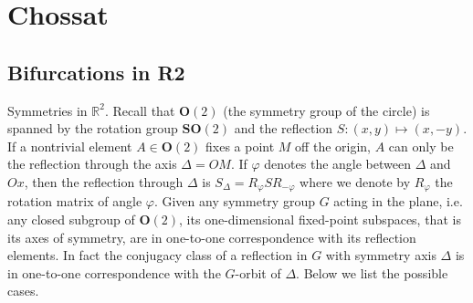 \documentclass{scrartcl}
\begin{document}
  \section{Chossat}
    \subsection{Bifurcations in R2}
    Symmetries in \(\mathbb{R}^{2}\).
    Recall that \(\mathbf{O}(2)\) (the symmetry group of the circle) is spanned by the rotation group \(\mathbf{S O}(2)\) and the reflection \(S:(x, y) \mapsto(x,-y)\).
    If a nontrivial element \(A \in \mathbf{O}(2)\) fixes a point \(M\) off the origin, \(A\) can only be the reflection through the axis \(\Delta = O M\).
    If \(\varphi\) denotes the angle between \(\Delta\) and \(O x\), then the reflection through \(\Delta\) is \(S_{\Delta}=R_{\varphi} S R_{-\varphi}\) where we denote by \(R_{\varphi}\) the rotation matrix of angle \(\varphi\).
    Given any symmetry group \(G\) acting in the plane, i.e. any closed subgroup of \(\mathbf{O}(2)\), its one-dimensional fixed-point subspaces, that is its axes of symmetry, are in one-to-one correspondence with its reflection elements.
    In fact the conjugacy class of a reflection in \(G\) with symmetry axis \(\Delta\) is in one-to-one correspondence with the \(G\)-orbit of \(\Delta\).
    Below we list the possible cases.
\end{document}
